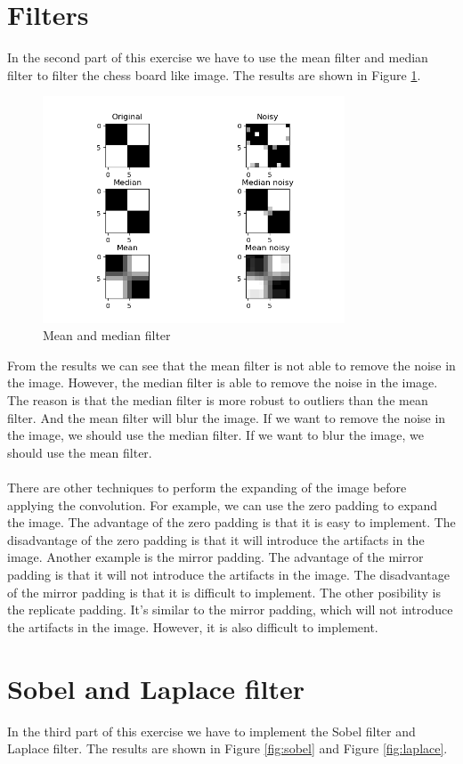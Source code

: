 \documentclass[12pt
,headinclude
,headsepline
,bibtotocnumbered
]{scrartcl}
\begin{document}
\section{Filters}
In the second part of this exercise we have to use the mean filter and median filter to filter the chess board like image. The results are shown in Figure \ref{fig:mean}. 
\begin{figure}[H]
    \centering
    \includegraphics[width=0.8\textwidth]{chessboard.png}
    \caption{Mean and median filter}
    \label{fig:mean}
\end{figure}
From the results we can see that the mean filter is not able to remove the noise in the image. However, the median filter is able to remove the noise in the image. The reason is that the median filter is more robust to outliers than the mean filter. And the mean filter will blur the image. If we want to remove the noise in the image, we should use the median filter. If we want to blur the image, we should use the mean filter.
\\\\
There are other techniques to perform the expanding of the image before applying the convolution. For example, we can use the zero padding to expand the image. The advantage of the zero padding is that it is easy to implement. The disadvantage of the zero padding is that it will introduce the artifacts in the image. Another example is the mirror padding. The advantage of the mirror padding is that it will not introduce the artifacts in the image. The disadvantage of the mirror padding is that it is difficult to implement. The other posibility is the replicate padding. It's similar to the mirror padding, which will not introduce the artifacts in the image. However, it is also difficult to implement.
\section{Sobel and Laplace filter}
In the third part of this exercise we have to implement the Sobel filter and Laplace filter. The results are shown in Figure \ref{fig:sobel} and Figure \ref{fig:laplace}.
\end{document}
